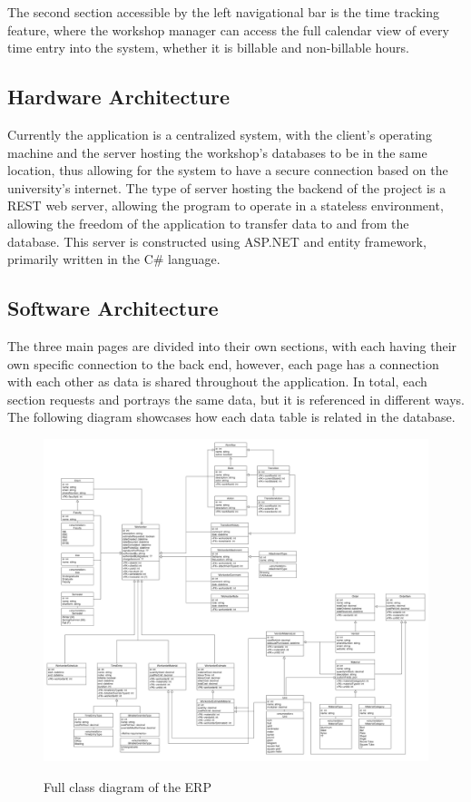 {{{{{{{The second section accessible by the left navigational bar is the time tracking feature, where the workshop manager can access the full calendar view of every time entry into the system, whether it is billable and non-billable hours. 

\subsection{Hardware Architecture}
Currently the application is a centralized system, with the client's operating machine and the server hosting the workshop's databases to be in the same location, thus allowing for the system to have a secure connection based on the university's internet. The type of server hosting the backend of the project is a REST web server, allowing the program to operate in a stateless environment, allowing the freedom of the application to transfer data to and from the database. This server is constructed using ASP.NET and entity framework, primarily written in the C\# language.   

\subsection{Software Architecture}
The three main pages are divided into their own sections, with each having their own specific connection to the back end, however, each page has a connection with each other as data is shared throughout the application. In total, each section requests and portrays the same data, but it is referenced in different ways. The following diagram showcases how each data table is related in the database.   
\begin{figure}[H]
	\centering
	\includegraphics[width=7in]{class.png}\\
	\caption{Full class diagram of the ERP}
	\label{fig:tobias}
\end{figure}

}}}}}}}

